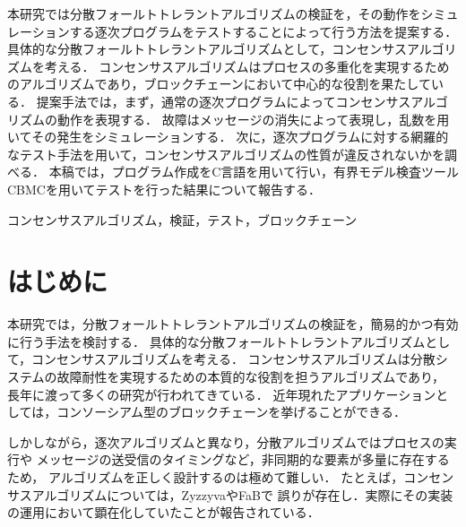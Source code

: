 \documentclass[technicalreport]{ieicej}
\def\IEICEJcls{\texttt{ieicej.cls}}
\def\IEICEJver{3.1}
\theoremstyle{plain}
\begin{document}
\begin{jabstract}
本研究では分散フォールトトレラントアルゴリズムの検証を，その動作をシミュレーションする逐次プログラムをテストすることによって行う方法を提案する．
具体的な分散フォールトトレラントアルゴリズムとして，コンセンサスアルゴリズムを考える．
コンセンサスアルゴリズムはプロセスの多重化を実現するためのアルゴリズムであり，ブロックチェーンにおいて中心的な役割を果たしている．
提案手法では，まず，通常の逐次プログラムによってコンセンサスアルゴリズムの動作を表現する．
故障はメッセージの消失によって表現し，乱数を用いてその発生をシミュレーションする．
次に，逐次プログラムに対する網羅的なテスト手法を用いて，コンセンサスアルゴリズムの性質が違反されないかを調べる．
本稿では，プログラム作成をC言語を用いて行い，有界モデル検査ツールCBMCを用いてテストを行った結果について報告する．
\end{jabstract}
\begin{jkeyword}
	コンセンサスアルゴリズム，検証，テスト，ブロックチェーン
\end{jkeyword}
\maketitle

\section{はじめに}

本研究では，分散フォールトトレラントアルゴリズムの検証を，簡易的かつ有効に行う手法を検討する．
具体的な分散フォールトトレラントアルゴリズムとして，コンセンサスアルゴリズムを考える．
コンセンサスアルゴリズムは分散システムの故障耐性を実現するための本質的な役割を担うアルゴリズムであり，
長年に渡って多くの研究が行われてきている．
近年現れたアプリケーションとしては，コンソーシアム型のブロックチェーンを挙げることができる．

しかしながら，逐次アルゴリズムと異なり，分散アルゴリズムではプロセスの実行や
メッセージの送受信のタイミングなど，非同期的な要素が多量に存在するため，
アルゴリズムを正しく設計するのは極めて難しい．
たとえば，コンセンサスアルゴリズムについては，Zyzzyva\cite{KotlaADCW09}やFaB\cite{MartinA05}で
誤りが存在し．実際にその実装の運用において顕在化していたことが報告されている\cite{Abraham2017}．
\end{document}
